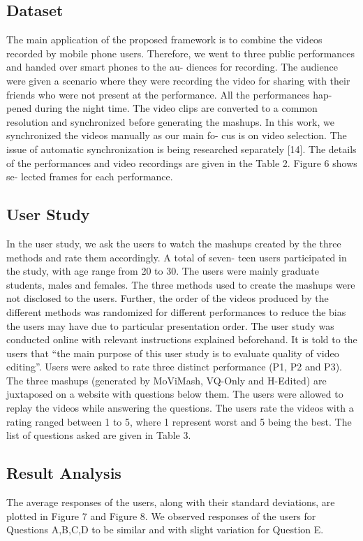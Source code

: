 \documentclass{sig-alternate-05-2015}
\begin{document}
\subsection{Dataset}
The main application of the proposed framework is to combine
the videos recorded by mobile phone users. Therefore, we went to
three public performances and handed over smart phones to the au-
diences for recording. The audience were given a scenario where
they were recording the video for sharing with their friends who
were not present at the performance. All the performances hap-
pened during the night time. The video clips are converted to a
common resolution and synchronized before generating the mashups.
In this work, we synchronized the videos manually as our main fo-
cus is on video selection. The issue of automatic synchronization is
being researched separately [14]. The details of the performances
and video recordings are given in the Table 2. Figure 6 shows se-
lected frames for each performance.
\subsection{User Study}
In the user study, we ask the users to watch the mashups created
by the three methods and rate them accordingly. A total of seven-
teen users participated in the study, with age range from 20 to 30.
The users were mainly graduate students, males and females. The
three methods used to create the mashups were not disclosed to the
users. Further, the order of the videos produced by the different
methods was randomized for different performances to reduce the
bias the users may have due to particular presentation order.
The user study was conducted online with relevant instructions
explained beforehand. It is told to the users that “the main purpose
of this user study is to evaluate quality of video editing”. Users
were asked to rate three distinct performance (P1, P2 and P3). The
three mashups (generated by MoViMash, VQ-Only and H-Edited)
are juxtaposed on a website with questions below them. The users were allowed to replay the videos while answering the questions.
The users rate the videos with a rating ranged between 1 to 5, where
1 represent worst and 5 being the best. The list of questions asked
are given in Table 3.
\subsection{Result Analysis}
The average responses of the users, along with their standard
deviations, are plotted in Figure 7 and Figure 8. We observed responses of the users for Questions A,B,C,D to be similar and with
slight variation for Question E.
\end{document}
